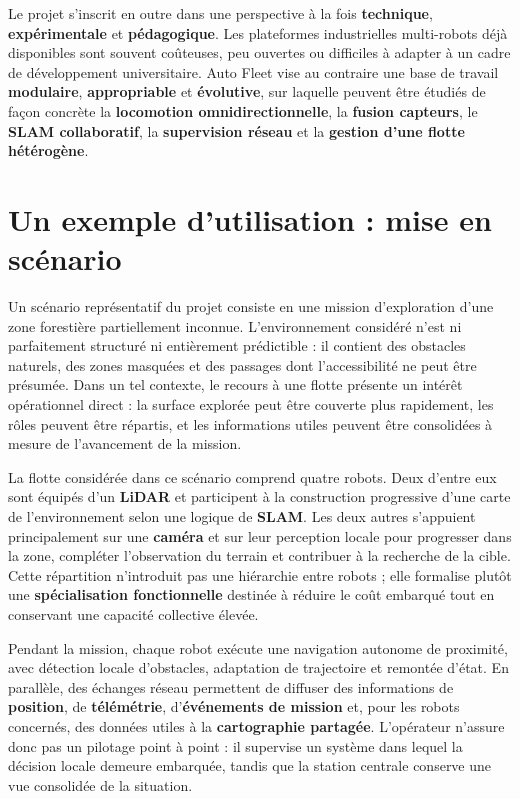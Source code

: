 \documentclass[11pt,a4paper]{report}
\newcommand{\kw}[1]{\textbf{#1}}
\begin{document}
Le projet s’inscrit en outre dans une perspective à la fois \kw{technique}, \kw{expérimentale} et \kw{pédagogique}. Les plateformes industrielles multi-robots déjà disponibles sont souvent coûteuses, peu ouvertes ou difficiles à adapter à un cadre de développement universitaire. Auto Fleet vise au contraire une base de travail \kw{modulaire}, \kw{appropriable} et \kw{évolutive}, sur laquelle peuvent être étudiés de façon concrète la \kw{locomotion omnidirectionnelle}, la \kw{fusion capteurs}, le \kw{SLAM collaboratif}, la \kw{supervision réseau} et la \kw{gestion d’une flotte hétérogène}.

\section{Un exemple d’utilisation : mise en scénario}

Un scénario représentatif du projet consiste en une mission d’exploration d’une zone forestière partiellement inconnue. L’environnement considéré n’est ni parfaitement structuré ni entièrement prédictible : il contient des obstacles naturels, des zones masquées et des passages dont l’accessibilité ne peut être présumée. Dans un tel contexte, le recours à une flotte présente un intérêt opérationnel direct : la surface explorée peut être couverte plus rapidement, les rôles peuvent être répartis, et les informations utiles peuvent être consolidées à mesure de l’avancement de la mission.

La flotte considérée dans ce scénario comprend quatre robots. Deux d’entre eux sont équipés d’un \kw{LiDAR} et participent à la construction progressive d’une carte de l’environnement selon une logique de \kw{SLAM}. Les deux autres s’appuient principalement sur une \kw{caméra} et sur leur perception locale pour progresser dans la zone, compléter l’observation du terrain et contribuer à la recherche de la cible. Cette répartition n’introduit pas une hiérarchie entre robots ; elle formalise plutôt une \kw{spécialisation fonctionnelle} destinée à réduire le coût embarqué tout en conservant une capacité collective élevée.

Pendant la mission, chaque robot exécute une navigation autonome de proximité, avec détection locale d’obstacles, adaptation de trajectoire et remontée d’état. En parallèle, des échanges réseau permettent de diffuser des informations de \kw{position}, de \kw{télémétrie}, d’\kw{événements de mission} et, pour les robots concernés, des données utiles à la \kw{cartographie partagée}. L’opérateur n’assure donc pas un pilotage point à point : il supervise un système dans lequel la décision locale demeure embarquée, tandis que la station centrale conserve une vue consolidée de la situation.
\end{document}

